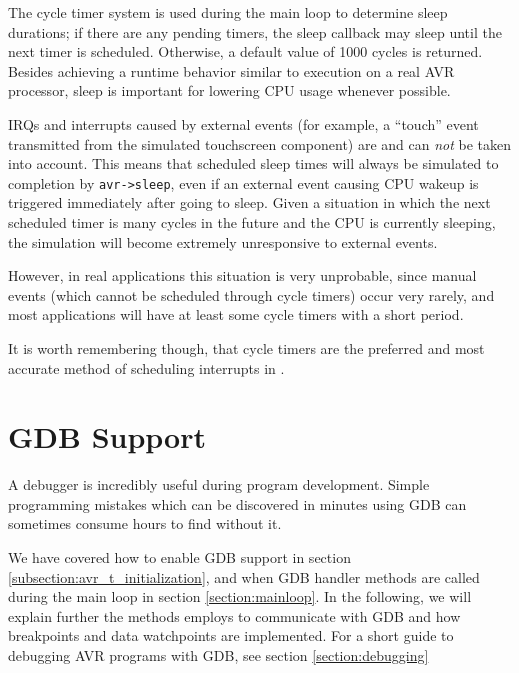 The cycle timer system is used during the main loop to determine sleep durations;
if there are any pending timers, the sleep callback may sleep until the next timer
is scheduled. Otherwise, a default value of 1000 cycles is returned.
Besides achieving a runtime behavior similar to execution on a real \ac{AVR}
processor, sleep is important for lowering \simavr \ac{CPU} usage whenever possible.

\acp{IRQ} and interrupts caused by external events (for example, a ``touch'' event transmitted
from the simulated touchscreen component) are and can \emph{not} be taken into
account.
This means that scheduled sleep times will always be simulated to completion by
\lstinline|avr->sleep|, even if an external event causing \ac{CPU} wakeup is
triggered immediately after going to sleep.
Given a situation in which the next scheduled timer is many cycles in the future
and the \ac{CPU} is currently sleeping, the simulation will become extremely
unresponsive to external events.

However, in real applications this situation is very unprobable, since
manual events (which cannot be scheduled through cycle timers) occur very rarely,
and most applications will have at least some cycle timers with a short period.

It is worth remembering though, that cycle timers are the preferred and most
accurate method of scheduling interrupts in \simavr.


\section{\acf{GDB} Support}

A debugger is incredibly useful during program development. Simple programming mistakes
which can be discovered in minutes using \ac{GDB} can sometimes consume hours
to find without it.

We have covered how to enable \ac{GDB} support in section
\ref{subsection:avr_t_initialization}, and when \ac{GDB} handler methods are
called during the main loop in section \ref{section:mainloop}. In the following,
we will explain further the methods \simavr employs to communicate with
\ac{GDB} and how breakpoints and data watchpoints are implemented. For
a short guide to debugging \ac{AVR} programs with \ac{GDB}, see section
\ref{section:debugging}

